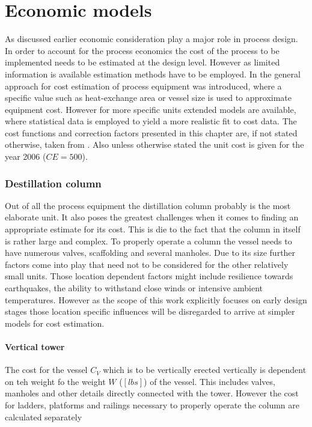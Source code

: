 \section{Economic models}
\label{sec:EconModel}
	As discussed earlier economic consideration play a major role in process design. In order to account
	for the process economics the cost of the process to be implemented needs to be estimated at the design
	level. However as limited information is available estimation methods have to be employed. In
	 the general approach for cost estimation of process equipment was
	introduced, where a specific value such as heat-exchange area or vessel size is used to approximate
	equipment cost. However for more specific units extended models are available, where statistical
	data is employed to yield a more realistic fit to cost data. The cost functions and correction
	factors presented in this chapter are, if not stated otherwise, taken from \cite{Seider.2010}.
	Also unless otherwise stated the unit cost is given for the year 2006 ($CE = 500$).
	
	\subsubsection{Destillation column}
		Out of all the process equipment the distillation column probably is the most elaborate
		unit. It also poses the greatest challenges when it comes to finding an appropriate
		estimate for its cost. This is die to the fact that the column in itself is rather
		large and complex. To properly operate a column the vessel needs to have numerous
		valves, scaffolding and several manholes. Due to its size further factors come into
		play that need not to be considered for the other relatively small units. Those location
		dependent factors might include resilience towards earthquakes, the ability to withstand
		close winds or intensive ambient temperatures. However as the scope of this work explicitly
		focuses on early design stages those location specific influences will be disregarded
		to arrive at simpler models for cost estimation.
		
		\paragraph{Vertical tower}
			The cost for the vessel $C_V$ which is to be vertically erected vertically is dependent
			on teh weight fo the weight $W$ ($[lbs]$) of the vessel. This includes valves, manholes and
			other details directly connected with the tower. However the cost for ladders,
			platforms and railings necessary to properly operate the column are calculated
			separately
			
